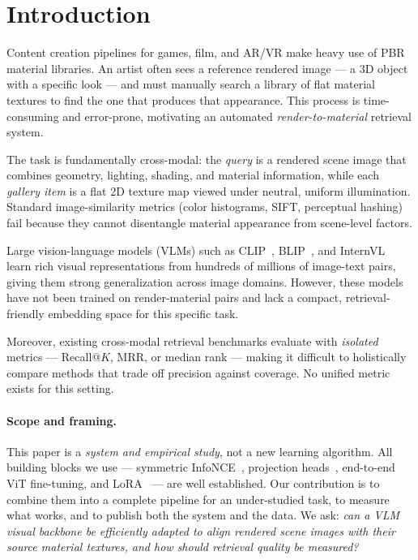 \documentclass[10pt,twocolumn]{article}
\begin{document}
\section{Introduction}

Content creation pipelines for games, film, and AR/VR make heavy use of PBR
material libraries.
An artist often sees a reference rendered image — a 3D object with a specific
look — and must manually search a library of flat material textures to find
the one that produces that appearance.
This process is time-consuming and error-prone, motivating an automated
\emph{render-to-material} retrieval system.

The task is fundamentally cross-modal: the \emph{query} is a rendered scene
image that combines geometry, lighting, shading, and material information,
while each \emph{gallery item} is a flat 2D texture map viewed under neutral,
uniform illumination.
Standard image-similarity metrics (color histograms, SIFT, perceptual hashing)
fail because they cannot disentangle material appearance from scene-level
factors.

Large vision-language models (VLMs) such as CLIP~\cite{radford2021clip},
BLIP~\cite{li2022blip}, and InternVL~\cite{chen2024internvl} learn rich
visual representations from hundreds of millions of image-text pairs, giving
them strong generalization across image domains.
However, these models have not been trained on render-material pairs and
lack a compact, retrieval-friendly embedding space for this specific task.

Moreover, existing cross-modal retrieval benchmarks evaluate with
\emph{isolated} metrics — Recall@$K$, MRR, or median rank — making it
difficult to holistically compare methods that trade off precision against
coverage.
No unified metric exists for this setting.

\paragraph{Scope and framing.}
This paper is a \emph{system and empirical study}, not a new learning
algorithm.
All building blocks we use --- symmetric InfoNCE~\cite{radford2021clip},
projection heads~\cite{chen2020simclr}, end-to-end ViT fine-tuning, and
LoRA~\cite{hu2022lora} --- are well established.
Our contribution is to combine them into a complete pipeline for an
under-studied task, to measure what works, and to publish both the system and
the data.
We ask: \emph{can a VLM visual backbone be efficiently adapted to align
rendered scene images with their source material textures, and how should
retrieval quality be measured?}
\end{document}
